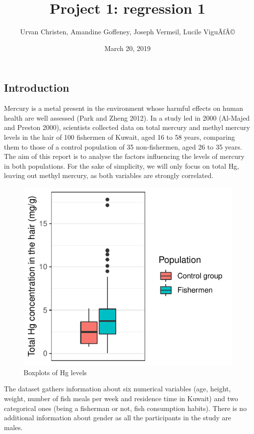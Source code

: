 \documentclass[12pt,]{article}
\title{Project 1: regression 1}
\author{Urvan Christen, Amandine Goffeney, Joseph Vermeil, Lucile ViguÃfÂ©}
\date{March 20, 2019}
\begin{document}
\maketitle

\subsection{Introduction}\label{introduction}

Mercury is a metal present in the environment whose harmful effects on
human health are well assessed (Park and Zheng 2012). In a study led in
2000 (Al-Majed and Preston 2000), scientists collected data on total
mercury and methyl mercury levels in the hair of 100 fishermen of
Kuwait, aged 16 to 58 years, comparing them to those of a control
population of 35 non-fishermen, aged 26 to 35 years. The aim of this
report is to analyse the factors influencing the levels of mercury in
both populations. For the sake of simplicity, we will only focus on
total Hg, leaving out methyl mercury, as both variables are strongly
correlated.

\begin{figure}

\hfill{}\includegraphics{Report_files/figure-latex/unnamed-chunk-4-1} 

\caption{Boxplots of Hg levels}\label{fig:unnamed-chunk-4}
\end{figure}

The dataset gathers information about six numerical variables (age,
height, weight, number of fish meals per week and residence time in
Kuwait) and two categorical ones (being a fisherman or not, fish
consumption habits). There is no additional information about gender as
all the participants in the study are males.
\end{document}
